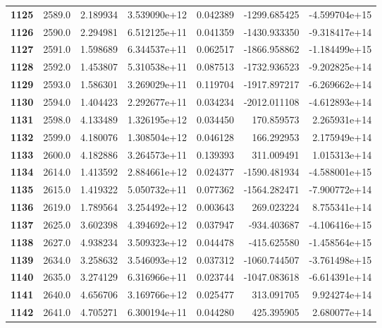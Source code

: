 \documentclass{report}[12pt]
\begin{document}
\begin{center}
\begin{tabular}{lrrrrrr}
\textbf{1125} &         2589.0 &   2.189934 &  3.539090e+12 &    0.042389 & -1299.685425 & -4.599704e+15 \\
\textbf{1126} &         2590.0 &   2.294981 &  6.512125e+11 &    0.041359 & -1430.933350 & -9.318417e+14 \\
\textbf{1127} &         2591.0 &   1.598689 &  6.344537e+11 &    0.062517 & -1866.958862 & -1.184499e+15 \\
\textbf{1128} &         2592.0 &   1.453807 &  5.310538e+11 &    0.087513 & -1732.936523 & -9.202825e+14 \\
\textbf{1129} &         2593.0 &   1.586301 &  3.269029e+11 &    0.119704 & -1917.897217 & -6.269662e+14 \\
\textbf{1130} &         2594.0 &   1.404423 &  2.292677e+11 &    0.034234 & -2012.011108 & -4.612893e+14 \\
\textbf{1131} &         2598.0 &   4.133489 &  1.326195e+12 &    0.034450 &   170.859573 &  2.265931e+14 \\
\textbf{1132} &         2599.0 &   4.180076 &  1.308504e+12 &    0.046128 &   166.292953 &  2.175949e+14 \\
\textbf{1133} &         2600.0 &   4.182886 &  3.264573e+11 &    0.139393 &   311.009491 &  1.015313e+14 \\
\textbf{1134} &         2614.0 &   1.413592 &  2.884661e+12 &    0.024377 & -1590.481934 & -4.588001e+15 \\
\textbf{1135} &         2615.0 &   1.419322 &  5.050732e+11 &    0.077362 & -1564.282471 & -7.900772e+14 \\
\textbf{1136} &         2619.0 &   1.789564 &  3.254492e+12 &    0.003643 &   269.023224 &  8.755341e+14 \\
\textbf{1137} &         2625.0 &   3.602398 &  4.394692e+12 &    0.037947 &  -934.403687 & -4.106416e+15 \\
\textbf{1138} &         2627.0 &   4.938234 &  3.509323e+12 &    0.044478 &  -415.625580 & -1.458564e+15 \\
\textbf{1139} &         2634.0 &   3.258632 &  3.546093e+12 &    0.037312 & -1060.744507 & -3.761498e+15 \\
\textbf{1140} &         2635.0 &   3.274129 &  6.316966e+11 &    0.023744 & -1047.083618 & -6.614391e+14 \\
\textbf{1141} &         2640.0 &   4.656706 &  3.169766e+12 &    0.025477 &   313.091705 &  9.924274e+14 \\
\textbf{1142} &         2641.0 &   4.705271 &  6.300194e+11 &    0.044280 &   425.395905 &  2.680077e+14 \\

\end{tabular}
\end{center}
\end{document}

